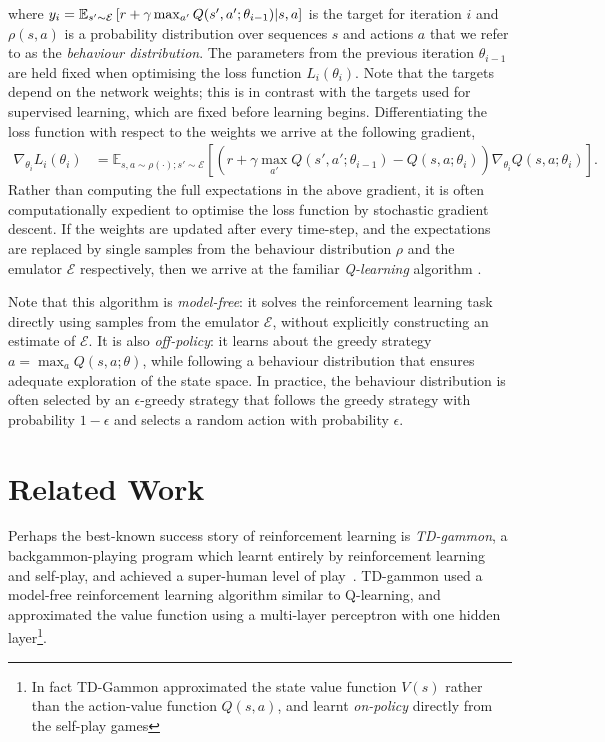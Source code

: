 \documentclass{article} \usepackage{nips13submit_e,times}
\begin{document}
where $y_i = \mathbb{E}_{s' \sim \mathcal{E}} \left[ r + \gamma \max_{a'} Q(s', a'; \theta_{i-1}) | s, a  \right]$ is the target for iteration $i$ and $\rho(s,a)$ is a probability distribution over sequences $s$ and actions $a$ that we refer to as the \emph{behaviour distribution}. The parameters from the previous iteration $\theta_{i-1}$ are held fixed when optimising the loss function $L_i\left(\theta_i\right)$. 
Note that the targets depend on the network weights; this is in contrast with the targets used for supervised learning, which are fixed before learning begins.
Differentiating the loss function with respect to the weights we arrive at the following gradient,
\begin{align}
\nabla_{\theta_i} L_i\left(\theta_i\right) &= \mathbb{E}_{s,a \sim \rho(\cdot); s' \sim \mathcal{E}} \left[ \left( r + \gamma \max_{a'} Q(s', a'; \theta_{i-1}) - Q(s,a ; \theta_i ) \right) \nabla_{\theta_i} Q(s,a;\theta_{i}) \right] .
\label{eq:q-learning-gradient}
\end{align}
Rather than computing the full expectations in the above gradient, it is often computationally expedient to optimise the loss function by stochastic gradient descent. If the weights are updated after every time-step, and the expectations are replaced by single samples from the behaviour distribution $\rho$ and the emulator $\mathcal{E}$ respectively, then we arrive at the familiar \emph{Q-learning} algorithm \cite{watkins-qlearning}. 

Note that this algorithm is \emph{model-free}: it solves the reinforcement learning task directly using samples from the emulator $\mathcal{E}$, without explicitly constructing an estimate of $\mathcal{E}$. It is also \emph{off-policy}: it learns about the greedy strategy $a = \max_{a} Q(s,a;\theta)$, while following a behaviour distribution that ensures adequate exploration of the state space. In practice, the behaviour distribution is often selected by an $\epsilon$-greedy strategy that follows the greedy strategy with probability $1 - \epsilon$ and selects a random action with probability $\epsilon$.

\section{Related Work}

Perhaps the best-known success story of reinforcement learning is \emph{TD-gammon}, a backgammon-playing program which learnt entirely by reinforcement learning and self-play, and achieved a super-human level of play~\cite{tesauro-95-backgammon}. TD-gammon used a model-free reinforcement learning algorithm similar to Q-learning, and approximated the value function using a multi-layer perceptron with one hidden layer\footnote{In fact TD-Gammon approximated the state value function $V(s)$ rather than the action-value function $Q(s,a)$, and learnt \emph{on-policy} directly from the self-play games}. 
\end{document}
